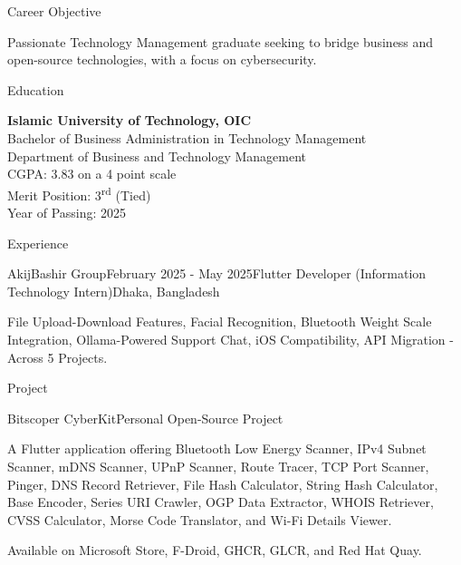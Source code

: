 \documentclass[
	a4paper,
	12pt,
]{resume}
\begin{document}
\begin{rSection}{Career Objective}

	Passionate Technology Management graduate seeking to bridge business and open-source technologies, with a focus on cybersecurity.

\end{rSection}

\begin{rSection}{Education}

	\textbf{Islamic University of Technology, OIC} \hfill \textit{} \\
	Bachelor of Business Administration in Technology Management    \\
	Department of Business and Technology Management                \\
	CGPA: 3.83 on a 4 point scale                                   \\
	Merit Position: 3\textsuperscript{rd} (Tied)                    \\
	Year of Passing: 2025

\end{rSection}

\begin{rSection}{Experience}

	\begin{rSubsection}{AkijBashir Group}{February 2025 - May 2025}{Flutter Developer (Information Technology Intern)}{Dhaka, Bangladesh}
		\item File Upload-Download Features, Facial Recognition, Bluetooth Weight Scale Integration, Ollama-Powered Support Chat, iOS Compatibility, API Migration - Across 5 Projects.
	\end{rSubsection}

\end{rSection}

\begin{rSection}{Project}

	\begin{rSubsection}{Bitscoper CyberKit}{}{Personal Open-Source Project}{}
		\item A Flutter application offering Bluetooth Low Energy Scanner, IPv4 Subnet Scanner, mDNS Scanner, UPnP Scanner, Route Tracer, TCP Port Scanner, Pinger, DNS Record Retriever, File Hash Calculator, String Hash Calculator, Base Encoder, Series URI Crawler, OGP Data Extractor, WHOIS Retriever, CVSS Calculator, Morse Code Translator, and Wi-Fi Details Viewer.
		\item Available on Microsoft Store, F-Droid, GHCR, GLCR, and Red Hat Quay.
	\end{rSubsection}

\end{rSection}
\end{document}
